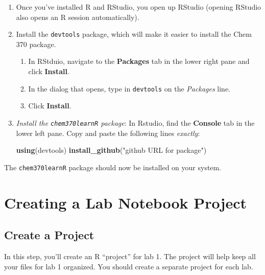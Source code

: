 \documentclass[]{tufte-book}
\newenvironment{Shaded}{}{}
\newcommand{\KeywordTok}[1]{\textcolor[rgb]{0.00,0.44,0.13}{\textbf{#1}}}
\newcommand{\NormalTok}[1]{#1}
\newcommand{\StringTok}[1]{\textcolor[rgb]{0.25,0.44,0.63}{#1}}
\providecommand{\tightlist}{%
  \setlength{\itemsep}{0pt}\setlength{\parskip}{0pt}}
\begin{document}
\begin{enumerate}
\def\labelenumi{\arabic{enumi}.}
\item
  Once you've installed R and RStudio, you open up RStudio (opening RStudio also opens an R session automatically).\\
\item
  Install the \texttt{devtools} package, which will make it easier to install the Chem 370 package.

  \begin{enumerate}
  \def\labelenumii{\arabic{enumii}.}
  \tightlist
  \item
    In RStduio, navigate to the \textbf{Packages} tab in the lower right pane and click \textbf{Install}.
  \item
    In the dialog that opens, type in \texttt{devtools} on the \emph{Packages} line.
  \item
    Click \textbf{Install}.
  \end{enumerate}
\item
  \emph{Install the \texttt{chem370learnR} package}: In Rstudio, find the \textbf{Console} tab in the lower left pane. Copy and paste the following lines \emph{exactly}:

\begin{Shaded}
\begin{Highlighting}[]
\KeywordTok{using}\NormalTok{(devtools)}
\KeywordTok{install_github}\NormalTok{(}\StringTok{"github URL for package"}\NormalTok{)}
\end{Highlighting}
\end{Shaded}
\end{enumerate}

The \texttt{chem370learnR} package should now be installed on your system.

\hypertarget{create-lab-notebook}{%
\section*{Creating a Lab Notebook Project}\label{create-lab-notebook}}

\hypertarget{create-a-project}{%
\subsection*{Create a Project}\label{create-a-project}}

In this step, you'll create an R ``project'' for lab 1. The project will help keep all your files for lab 1 organized. You should create a separate project for each lab.
\end{document}
